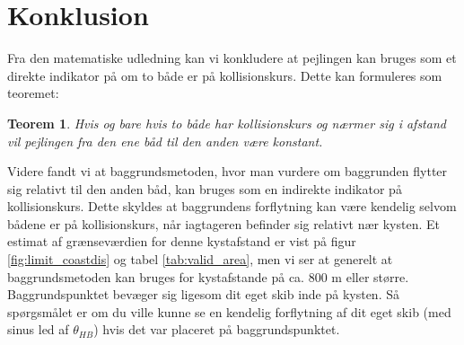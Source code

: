 \documentclass[%
 reprint,
nofootinbib,
aps,
]{revtex4-1}
\newtheorem*{theorem-non}{Teorem}
\begin{document}

\section{Konklusion}
Fra den matematiske udledning kan vi konkludere at pejlingen kan bruges som et direkte indikator på om to både er på kollisionskurs. Dette kan formuleres som teoremet:

\begin{theorem-non}
  Hvis og bare hvis to både har kollisionskurs og nærmer sig i afstand vil pejlingen fra den ene båd til den anden være konstant.
\end{theorem-non}

Videre fandt vi at baggrundsmetoden, hvor man vurdere om baggrunden flytter sig relativt til den anden båd, kan bruges som en indirekte indikator på kollisionskurs. Dette skyldes at baggrundens forflytning kan være kendelig selvom bådene er på kollisionskurs, når iagtageren befinder sig relativt nær kysten. Et estimat af grænseværdien for denne kystafstand er vist på figur \ref{fig:limit_coastdis} og tabel \ref{tab:valid_area}, men vi ser at generelt at baggrundsmetoden kan bruges for kystafstande på ca. 800 m eller større.
\\
Baggrundspunktet bevæger sig ligesom dit eget skib inde på kysten. Så spørgsmålet er om du ville kunne se en kendelig forflytning af dit eget skib (med sinus led af $\theta_{HB}$) hvis det var placeret på baggrundspunktet.
\end{document}
